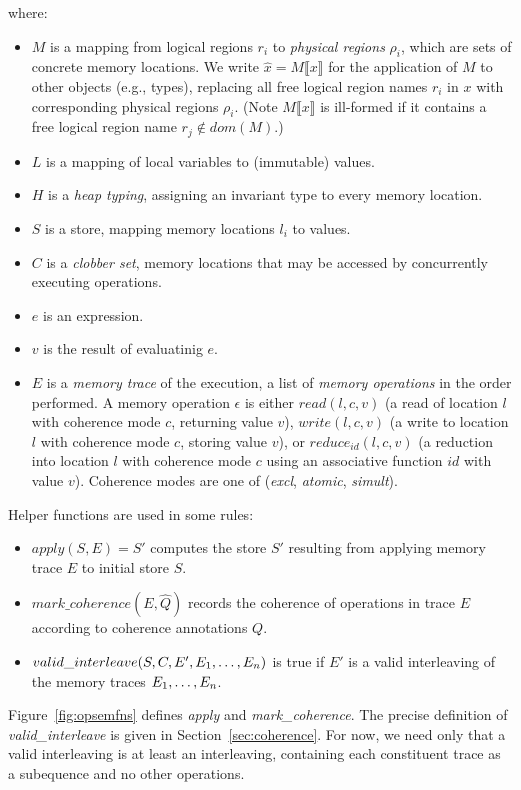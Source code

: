where: 
\begin{itemize}
\item $M$ is a mapping from logical regions $r_i$ to {\em physical regions} $\rho_i$, which are sets of concrete memory locations.
We write $\hat x = M \llbracket x \rrbracket$ for the application of $M$ to other objects (e.g., types), 
replacing all free logical region names $r_i$ in $x$ with corresponding physical regions $\rho_i$.  
(Note $M \llbracket x \rrbracket$ is ill-formed if it contains a free logical region name $r_j \not\in dom(M)$.)

\item $L$ is a mapping of local variables to (immutable) values.  

\item $H$ is a {\em heap typing}, assigning an invariant type to every memory location. 

\item $S$ is a store, mapping memory locations $l_i$ to values.

\item $C$ is a {\em clobber set}, memory locations that may be accessed by concurrently executing operations.

\item $e$ is an expression.

\item $v$ is the result of evaluatinig $e$.

\item $E$ is a {\em memory trace} of the execution, a list of {\em memory operations}
in the order performed.  A memory operation $\epsilon$ is either
$read(l, c, v)$ (a read of location $l$ with coherence mode $c$, returning value $v$),
$write(l, c, v)$ (a write to location $l$ with coherence mode $c$, storing value $v$),
or $reduce_{id}(l, c, v)$ (a reduction into location $l$ with coherence mode $c$ using an
associative function $id$ with value $v$).  Coherence modes are one of ({\em excl}, {\em atomic}, {\em simult}).
\end{itemize}

Helper functions are used in some rules:
\begin{itemize}
\item $apply(S, E) = S'$ computes the store $S'$ resulting from applying memory trace $E$ to initial store $S$.

\item $mark\_coherence(E, \hat Q)$ records the coherence of operations in trace $E$ according to coherence annotations $Q$. 

\item $valid\_interleave(S, C, E', {E}_1,\ldots,{E}_n)$ is true if $E'$ is a valid interleaving
of the memory traces ${E}_1,\ldots,{E}_n$.
\end{itemize}
Figure~\ref{fig:opsemfns} defines {\em apply} and {\em mark\_coherence}.  The precise definition of
{\em valid\_interleave} is given in Section~\ref{sec:coherence}.  For now, we need only that a valid interleaving
is at least an interleaving, containing each constituent trace as a subequence and no other operations.

